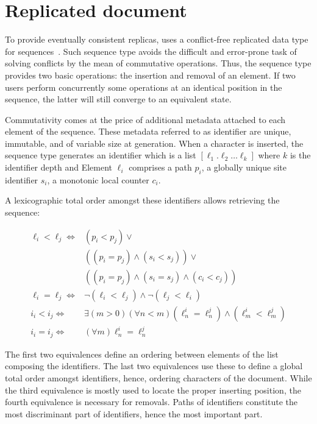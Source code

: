 
\section{Replicated document}
\label{sec:structure}

To provide eventually consistent replicas, \CRATE uses a conflict-free
replicated data type for sequences~\cite{shapiro2011comprehensive}. Such
sequence type avoids the difficult and error-prone task of solving conflicts by
the mean of commutative operations. Thus, the sequence type provides two basic
operations: the insertion and removal of an element. If two users perform
concurrently some operations at an identical position in the sequence, the
latter will still converge to an equivalent state.

Commutativity comes at the price of additional metadata attached to each
element of the sequence. These metadata referred to as identifier are unique,
immutable, and of variable size at generation. When a character is inserted, the
sequence type generates an identifier which is a list
$[\ell_1.\ell_2\ldots \ell_k]$ where $k$ is the identifier depth and Element
$\ell_i$ comprises a path $p_i$, a globally unique site identifier $s_i$, a
monotonic local counter $c_i$.

A lexicographic total order amongst these identifiers allows retrieving the
sequence:



\begin{align*}
  \ell_i < \ell_j \iff & (p_i < p_j) \vee \\
                       & ((p_i = p_j) \wedge (s_i<s_j)) \vee \\
                       & ((p_i = p_j) \wedge (s_i = s_j) \wedge (c_i < c_j)) \\
  \ell_i = \ell_j \iff & \neg (\ell_i < \ell_j) \wedge \neg (\ell_j < \ell_i) \\
  i_i < i_j \iff & \exists (m > 0)(\forall n < m) (\ell^i_n = \ell^j_n) \wedge (\ell^i_m < \ell^j_m) \\
  i_i = i_j \iff & (\forall m) \ell^i_n = \ell^j_n
\end{align*}

The first two equivalences define an ordering between elements of the list
composing the identifiers. The last two equivalences use these to define a
global total order amongst identifiers, hence, ordering characters of the
document. While the third equivalence is mostly used to locate the proper
inserting position, the fourth equivalence is necessary for removals.  Paths of
identifiers constitute the most discriminant part of identifiers, hence the most
important part.

